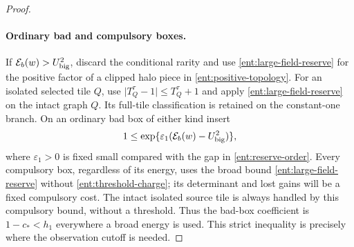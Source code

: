 \begin{proof}
\paragraph{Ordinary bad and compulsory boxes.}
If \(\mathcal E_b(w)>U_{\rm big}^2\), discard the conditional
rarity and use \eqref{ent:large-field-reserve} for the
positive factor of a clipped halo piece in
\eqref{ent:positive-topology}.  For an isolated selected tile \(Q\),
use \(\lvert T_Q^\tau-1\rvert\le T_Q^\tau+1\) and apply
\eqref{ent:large-field-reserve} on the intact graph \(Q\).
Its full-tile classification is retained on the constant-one branch.
On an ordinary bad box of either kind insert
\begin{equation}\label{ent:threshold-charge}
  1\le
     \exp\{\varepsilon_1(\mathcal E_b(w)-U_{\rm big}^2)\},
\end{equation}
where \(\varepsilon_1>0\) is fixed small compared with the
gap in \eqref{ent:reserve-order}.  Every compulsory box, regardless
of its energy, uses the broad bound
\eqref{ent:large-field-reserve} without
\eqref{ent:threshold-charge}; its determinant and lost
gains will be a fixed compulsory cost.  The intact isolated source
tile is always handled by this compulsory bound, without a threshold.
Thus the bad-box
coefficient is \(1-c_*<h_1\) everywhere a broad energy is
used.  This strict inequality is precisely where the
observation cutoff is needed.


\end{proof}
